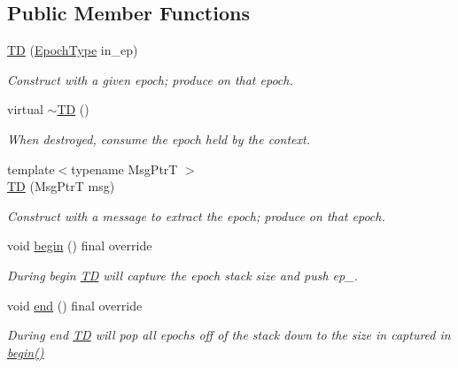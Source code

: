\subsection*{Public Member Functions}
\begin{DoxyCompactItemize}
\item 
\hyperlink{structvt_1_1ctx_1_1_t_d_ade8d2b390d1b4a484dd9f5f20546bc91}{TD} (\hyperlink{namespacevt_a81d11b28122d43bf9834577e4a06440f}{Epoch\+Type} in\+\_\+ep)
\begin{DoxyCompactList}\small\item\em Construct with a given epoch; produce on that epoch. \end{DoxyCompactList}\item 
virtual \hyperlink{structvt_1_1ctx_1_1_t_d_a7682445c6790c8176124c080c3ca340c}{$\sim$\+TD} ()
\begin{DoxyCompactList}\small\item\em When destroyed, consume the epoch held by the context. \end{DoxyCompactList}\item 
{\footnotesize template$<$typename Msg\+PtrT $>$ }\\\hyperlink{structvt_1_1ctx_1_1_t_d_a59c6dbce4737da7d99a9175be2ed9053}{TD} (Msg\+PtrT msg)
\begin{DoxyCompactList}\small\item\em Construct with a message to extract the epoch; produce on that epoch. \end{DoxyCompactList}\item 
void \hyperlink{structvt_1_1ctx_1_1_t_d_a5ba29186cd3ac75a48272e0ac050228b}{begin} () final override
\begin{DoxyCompactList}\small\item\em During begin {\ttfamily \hyperlink{structvt_1_1ctx_1_1_t_d}{TD}} will capture the epoch stack size and push {\ttfamily ep\+\_\+}. \end{DoxyCompactList}\item 
void \hyperlink{structvt_1_1ctx_1_1_t_d_a5131b9af6b389c90c1ac908c7dcc59b9}{end} () final override
\begin{DoxyCompactList}\small\item\em During end {\ttfamily \hyperlink{structvt_1_1ctx_1_1_t_d}{TD}} will pop all epochs off of the stack down to the size in captured in {\ttfamily \hyperlink{structvt_1_1ctx_1_1_t_d_a5ba29186cd3ac75a48272e0ac050228b}{begin()}} \end{DoxyCompactList}\item 

\end{DoxyCompactItemize}
